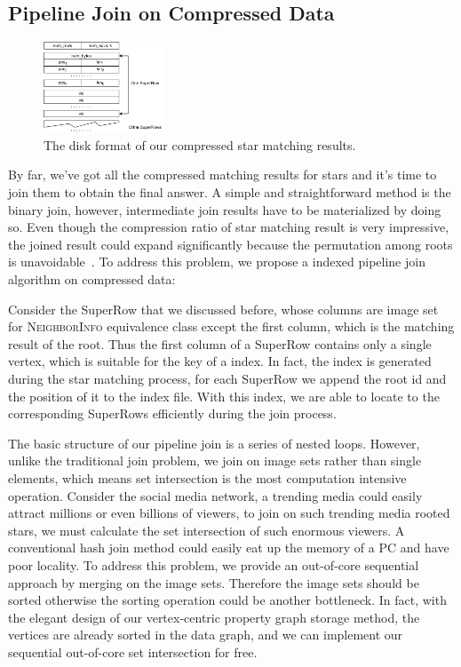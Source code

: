 \subsection{Pipeline Join on Compressed Data}\label{sec:match_join}
\begin{figure}[ht]
  \centering
  \includegraphics[width=0.32\textwidth]{img/compress.pdf}
  \caption{The disk format of our compressed star matching results.}\label{img:compress}
\end{figure}

By far, we've got all the compressed matching results for stars and it's time to join them to obtain the final answer.
A simple and straightforward method is the binary join, however, intermediate join results have to be materialized by doing so.
Even though the compression ratio of star matching result is very impressive,
the joined result could expand significantly because the permutation among roots is unavoidable~\cite{DBLP:journals/pvldb/SunWWSL12}.
To address this problem, we propose a indexed pipeline join algorithm on compressed data:

Consider the SuperRow that we discussed before, whose columns are image set for \textsc{NeighborInfo} equivalence class except the first column, which is the matching result of the root.
Thus the first column of a SuperRow contains only a single vertex, which is suitable for the key of a index.
In fact, the index is generated during the star matching process,
for each SuperRow we append the root id and the position of it to the index file.
With this index, we are able to locate to the corresponding SuperRows efficiently during the join process.

The basic structure of our pipeline join is a series of nested loops.
However, unlike the traditional join problem, we join on image sets rather than single elements,
which means set intersection is the most computation intensive operation.
Consider the social media network, a trending media could easily attract millions or even billions of viewers,
to join on such trending media rooted stars, we must calculate the set intersection of such enormous viewers.
A conventional hash join method could easily eat up the memory of a PC and have poor locality.
To address this problem, we provide an out-of-core sequential approach by merging on the image sets.
Therefore the image sets should be sorted otherwise the sorting operation could be another bottleneck.
In fact, with the elegant design of our vertex-centric property graph storage method,
the vertices are already sorted in the data graph, and we can implement our sequential out-of-core set intersection for free.
